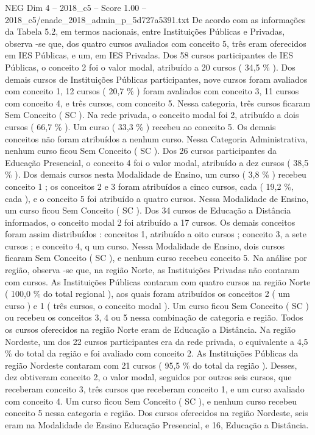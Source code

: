 \begin{textsample}{NEG Dim 4 – 2018\_c5 – Score 1.00 – 2018\_c5/enade\_2018\_admin\_p\_5d727a5391.txt}
De acordo com as informações da Tabela 5.2, em termos nacionais, entre Instituições Públicas e Privadas, observa -se que, dos quatro cursos avaliados com conceito 5, três eram oferecidos em IES Públicas, e um, em IES Privadas.
Dos 58 cursos participantes de IES Públicas, o conceito 2 foi o valor modal, atribuído a 20 cursos ( 34,5 \% ).
Dos demais cursos de Instituições Públicas participantes, nove cursos foram avaliados com conceito 1, 12 cursos ( 20,7 \% ) foram avaliados com conceito 3, 11 cursos com conceito 4, e três cursos, com conceito 5.
Nessa categoria, três cursos ficaram Sem Conceito ( SC ).
Na rede privada, o conceito modal foi 2, atribuído a dois cursos ( 66,7 \% ).
Um curso ( 33,3 \% ) recebeu ao conceito 5.
Os demais conceitos não foram atribuídos a nenhum curso.
Nessa Categoria Administrativa, nenhum curso ficou Sem Conceito ( SC ).
Dos 26 cursos participantes da Educação Presencial, o conceito 4 foi o valor modal, atribuído a dez cursos ( 38,5 \% ).
Dos demais cursos nesta Modalidade de Ensino, um curso ( 3,8 \% ) recebeu conceito 1 ; os conceitos 2 e 3 foram atribuídos a cinco cursos, cada ( 19,2 \%, cada ), e o conceito 5 foi atribuído a quatro cursos.
Nessa Modalidade de Ensino, um curso ficou Sem Conceito ( SC ).
Dos 34 cursos de Educação a Distância informados, o conceito modal 2 foi atribuído a 17 cursos.
Os demais conceitos foram assim distribuídos : conceitos 1, atribuído a oito cursos ; conceito 3, a sete cursos ; e conceito 4, q um curso.
Nessa Modalidade de Ensino, dois cursos ficaram Sem Conceito ( SC ), e nenhum curso recebeu conceito 5.
Na análise por região, observa -se que, na região Norte, as Instituições Privadas não contaram com cursos.
As Instituições Públicas contaram com quatro cursos na região Norte ( 100,0 \% do total regional ), aos quais foram atribuídos os conceitos 2 ( um curso ) e 1 ( três cursos, o conceito modal ).
Um curso ficou Sem Conceito ( SC ) ou recebeu os conceitos 3, 4 ou 5 nessa combinação de categoria e região.
Todos os cursos oferecidos na região Norte eram de Educação a Distância.
Na região Nordeste, um dos 22 cursos participantes era da rede privada, o equivalente a 4,5 \% do total da região e foi avaliado com conceito 2.
As Instituições Públicas da região Nordeste contaram com 21 cursos ( 95,5 \% do total da região ).
Desses, dez obtiveram conceito 2, o valor modal, seguidos por outros seis cursos, que receberam conceito 3, três cursos que receberam conceito 1, e um curso avaliado com conceito 4.
Um curso ficou Sem Conceito ( SC ), e nenhum curso recebeu conceito 5 nessa categoria e região.
Dos cursos oferecidos na região Nordeste, seis eram na Modalidade de Ensino Educação Presencial, e 16, Educação a Distância.

\end{textsample}

